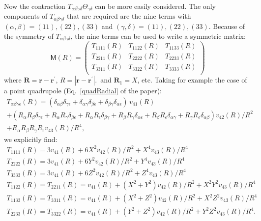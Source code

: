 Now the contraction $T_{\alpha \beta \gamma \delta} \Theta_{\gamma \delta}$ can be more easily considered.  
The only components of $T_{\alpha \beta \gamma \delta}$ that are required are the nine terms with
$(\alpha,\beta) = (11), (22), (33)$ and $(\gamma,\delta)=(11), (22), (33)$.
Because of the symmetry of $T_{\alpha \beta \gamma \delta}$, the nine terms can be used to write a
symmetric matrix:
\begin{equation*}
\mathsf{M}(R)=
\begin{pmatrix}
{T}_{1111}(R) & {T}_{1122}(R) & {T}_{1133}(R)\\
{T}_{2211}(R) & {T}_{2222}(R) & {T}_{2233}(R)\\
{T}_{3311}(R) & {T}_{3322}(R) & {T}_{3333}(R)\\
\end{pmatrix}
\end{equation*}
where $\mathbf{R}=\mathbf{r}- \mathbf{r^\prime}$, $R=|\mathbf{r}- \mathbf{r^\prime}|$.\
and $\mathbf{R}_1=X$, etc.
Taking for example the case of a point quadrupole (Eq.~\ref{quadRadial} of the paper):
\begin{gather*}
T_{\alpha \beta \gamma \epsilon}(R) = 
(\delta_{\alpha \beta} \delta_{\gamma \epsilon} 
+ \delta_{\alpha \gamma} \delta_{\beta \epsilon}  +\delta_{\beta \gamma}  \delta_{\alpha \epsilon} )\,v_{41}(R) \\
+ (R_\alpha R_\beta \delta_{\gamma  \epsilon} + R_\alpha R_\gamma \delta_{\beta \epsilon} 
+ R_\alpha R_ \epsilon \delta_{\beta \gamma} + R_\beta R_\gamma \delta_{\alpha \epsilon} 
+ R_\beta R_\epsilon \delta_{\alpha \gamma}  + R_\gamma R_\epsilon \delta_{\alpha \beta})
v_{42}(R)/R^2\\
+ R_\alpha R_\beta R_\gamma R_\epsilon v_{43}(R)/R^4 ,
\end{gather*}
we explicitly find:
\begin{gather*}
T_{1111}(R)=3v_{41}(R)+6X^2v_{42}(R)/R^2+X^4v_{43}(R)/R^4\\
T_{2222}(R)=3v_{41}(R)+6Y^2v_{42}(R)/R^2+Y^4v_{43}(R)/R^4\\
T_{3333}(R)=3v_{41}(R)+6Z^2v_{42}(R)/R^2+Z^4v_{43}(R)/R^4\\
T_{1122}(R)=T_{2211}(R)=v_{41}(R)+(X^2+Y^2)v_{42}(R)/R^2+X^2Y^2v_{43}(R)/R^4\\
T_{1133}(R)=T_{3311}(R)=v_{41}(R)+(X^2+Z^2)v_{42}(R)/R^2+X^2Z^2v_{43}(R)/R^4\\
T_{2233}(R)=T_{3322}(R)=v_{41}(R)+(Y^2+Z^2)v_{42}(R)/R^2+Y^2Z^2v_{43}(R)/R^4  .\\
\end{gather*}
